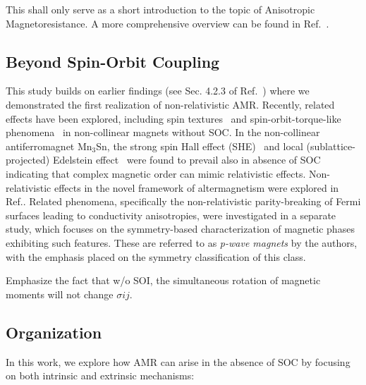 \documentclass[prb,showpacs,amsmath,amssymb,superscriptaddress,twocolumn,floatfix]{revtex4-1}
\begin{document}
This shall only serve as a short introduction to the topic of Anisotropic Magnetoresistance. A more comprehensive overview can be found in Ref.~\cite{Ritzinger:2023}.

\subsection{Beyond Spin-Orbit Coupling}

This study builds on earlier findings (see Sec. 4.2.3 of Ref.~\cite{Ritzinger:2023}) where we demonstrated the first realization of non-relativistic AMR. Recently, related effects have been explored, including spin textures~\cite{Bonbien:2022} and spin-orbit-torque-like phenomena~\cite{Gonzalez-Hernandez:2024} in non-collinear magnets without SOC. In the non-collinear antiferromagnet Mn$_3$Sn, the strong spin Hall effect (SHE)~\cite{Zhou:2020, Zhang:2017} and local (sublattice-projected) Edelstein effect~\cite{Gonzalez-Hernandez:2024} were found to prevail also in absence of SOC~\cite{Manna:2018, Gonzalez-Hernandez:2024} indicating that complex magnetic order can mimic relativistic effects. Non-relativistic effects in the novel framework of altermagnetism were explored in Ref.\cite{Jungwirth:2024}. Related phenomena, specifically the non-relativistic parity-breaking of Fermi surfaces leading to conductivity anisotropies, were investigated in a separate study\cite{BirkHellens:2023}, which focuses on the symmetry-based characterization of magnetic phases exhibiting such features. These are referred to as \textit{p-wave magnets} by the authors, with the emphasis placed on the symmetry classification of this class.

{\color{red} Emphasize the fact that w/o SOI, the simultaneous
  rotation of magnetic moments will not change $\sigma{ij}$.}

\subsection{Organization}

In this work, we explore how AMR can arise in the absence of SOC by focusing on both intrinsic and extrinsic mechanisms: \\
\end{document}
